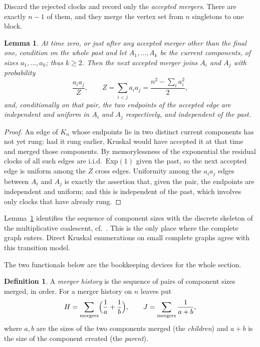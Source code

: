 \documentclass[11pt,a4paper]{amsart}
\theoremstyle{plain}
\newtheorem{lemma}[theorem]{Lemma}
\theoremstyle{definition}
\newtheorem{definition}[theorem]{Definition}
\theoremstyle{remark}
\begin{document}
Discard the rejected clocks and record only the \emph{accepted mergers}. There are
exactly $n-1$ of them, and they merge the vertex set from $n$ singletons to one
block.

\begin{lemma}
\label{lem:coalescent}
At time zero, or just after any accepted merger other than the final one,
condition on the whole past and let $A_1,\dots,A_k$ be the current components,
of sizes $a_1,\dots,a_k$; thus $k\ge2$. Then the next accepted merger joins
$A_i$ and $A_j$ with
probability
\begin{equation}
\label{eq:mcrate}
\frac{a_ia_j}{Z},\qquad Z=\sum_{i<j}a_ia_j=\frac{n^2-\sum_i a_i^2}{2},
\end{equation}
and, conditionally on that pair, the two endpoints of the accepted edge are
independent and uniform in $A_i$ and $A_j$ respectively, and independent of the
past.
\end{lemma}

\begin{proof}
An edge of $K_n$ whose endpoints lie in two distinct current components has not
yet rung: had it rung earlier, Kruskal would have accepted it at that time and
merged those components. By memorylessness of the exponential the residual
clocks of all such edges are i.i.d.\ $\mathrm{Exp}(1)$ given the past, so the
next accepted edge is uniform among the $Z$ cross edges. Uniformity among the
$a_ia_j$ edges between $A_i$ and $A_j$ is exactly the assertion that, given the
pair, the endpoints are independent and uniform; and this is independent of the
past, which involves only clocks that have already rung.
\end{proof}

Lemma~\ref{lem:coalescent} identifies the sequence of component sizes with the
discrete skeleton of the multiplicative coalescent, cf.\ \cite{Aldous}. This is
the only place where the complete graph enters. Direct Kruskal enumerations on
small complete graphs agree with this transition model.

The two functionals below are the bookkeeping devices for the whole section.

\begin{definition}
\label{def:HJ}
A \emph{merger history} is the sequence of pairs of component sizes merged, in
order. For a merger history on $n$ leaves put
\[
H=\sum_{\text{mergers}}\Bigl(\frac1a+\frac1b\Bigr),
\qquad
J=\sum_{\text{mergers}}\frac1{a+b},
\]
where $a,b$ are the sizes of the two components merged (the \emph{children}) and
$a+b$ is the size of the component created (the \emph{parent}).
\end{definition}
\end{document}
